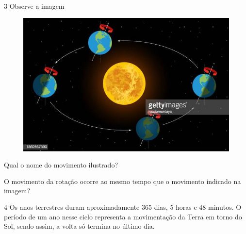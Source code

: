 \num{3} Observe a imagem


\begin{figure}[htpb!]
\includegraphics[width=\textwidth]{./imgs/img3.png}
\end{figure}

\begin{escolha}
\item Qual o nome do movimento ilustrado?


\item O movimento da rotação ocorre ao mesmo tempo que o movimento indicado na imagem?

\end{escolha}

\num{4} Os anos terrestres duram aproximadamente 365 dias, 5 horas
e 48 minutos. O período de um ano nesse ciclo representa a movimentação
da Terra em torno do Sol, sendo assim, a volta só termina no último dia.

